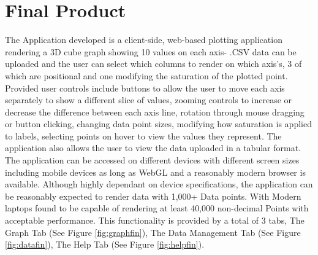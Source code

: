 \section{Final Product} \label{finprod}
The Application developed is a client-side, web-based plotting application rendering a 3D cube graph showing 10 values on each axis- .CSV data can be uploaded and the user can select which columns to render on which axis's, 3 of which are positional and one modifying the saturation of the plotted point.
Provided user controls include buttons to allow the user to move each axis separately to show a different slice of values, zooming controls to increase or decrease the difference between each axis line, rotation through mouse dragging or button clicking, changing data point sizes, modifying how saturation is applied to labels, selecting points on hover to view the values they represent. The application also allows the user to view the data uploaded in a tabular format.
The application can be accessed on different devices with different screen sizes including mobile devices as long as WebGL and a reasonably modern browser is available. Although highly dependant on device specifications, the application can be reasonably expected to render data with 1,000+ Data points. With Modern laptops found to be capable of rendering at least 40,000 non-decimal Points with acceptable performance.
This functionality is provided by a total of 3 tabs, The Graph Tab (See Figure \ref{fig:graphfin}), The Data Management Tab (See Figure \ref{fig:datafin}), The Help Tab (See Figure \ref{fig:helpfin}).

